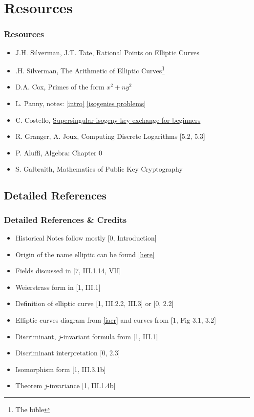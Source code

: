 \documentclass{beamer}
\begin{document}
\section{Resources}

\begin{frame}[noframenumbering]
    \frametitle{Resources}
    \begin{itemize}
        \item [0]  J.H. Silverman, J.T. Tate, Rational Points on Elliptic Curves 
        \item [1].H. Silverman, The Arithmetic of Elliptic Curves\footnote{The bible}
        \item [2] D.A. Cox, Primes of the form $x^2 + n y^2$
        \item [3,4] L. Panny, notes: \href{https://yx7.cc/docs/misc/isog_bristol_notes.pdf}{[intro]} \href{https://yx7.cc/docs/misc/isogprob_bristol_notes.pdf}{[isogenies problems]}
        \item [5]C. Costello, \href{https://eprint.iacr.org/2019/1321.pdf}{Supersingular isogeny key exchange for beginners}
        \item [6]R. Granger, A. Joux, Computing Discrete Logarithms [5.2, 5.3]
        \item [7]P. Aluffi, Algebra: Chapter 0
        \item [8]S. Galbraith, Mathematics of Public Key Cryptography
    \end{itemize}
\end{frame}
\subsection{Detailed References}
\begin{frame}[noframenumbering]
   \frametitle{Detailed References \& Credits}
   \begin{itemize}
       \item Historical Notes follow mostly [0, Introduction]
       \item Origin of the name elliptic can be found \href{https://www.unf.edu/~ddreibel/mas4932/elliptic-integrals.pdf}{[here]}
       \item Fields discussed in [7, III.1.14, VII]
       \item Weierstrass form in [1, III.1] 
       \item Definition of elliptic curve [1, III.2.2, III.3] or  [0, 2.2]
       \item Elliptic curves diagram from \href{https://www.iacr.org/authors/tikz/}{[iacr]} and curves from [1, Fig 3.1, 3.2]
       \item Discriminant, $j$-invariant formula from [1, III.1]
       \item Discriminant interpretation [0, 2.3]
       \item Isomorphism form [1, III.3.1b]
       \item Theorem $j$-invariance [1, III.1.4b]
       
   \end{itemize}
\end{frame}
\end{document}
